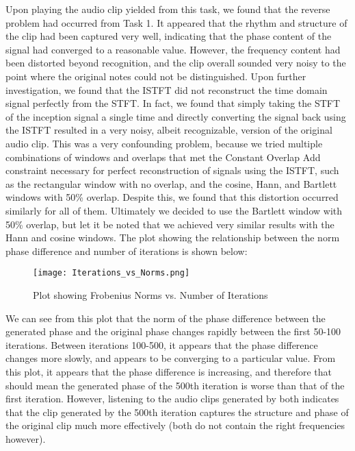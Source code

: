 \documentclass[letterpaper,twocolumn,10pt]{article}
\begin{document}
Upon playing the audio clip yielded from this task, we found that the reverse problem had occurred from Task 1. It appeared that the rhythm and structure of the clip had been captured very well, indicating that the phase content of the signal had converged to a reasonable value. However, the frequency content had been distorted beyond recognition, and the clip overall sounded very noisy to the point where the original notes could not be distinguished. \hspace*{\fill}
\vspace{3mm}
\linebreak
Upon further investigation, we found that the ISTFT did not reconstruct the time domain signal perfectly from the STFT. In fact, we found that simply taking the STFT of the inception signal a single time and directly converting the signal back using the ISTFT resulted in a very noisy, albeit recognizable, version of the original audio clip. This was a very confounding problem, because we tried multiple combinations of windows and overlaps that met the Constant Overlap Add constraint necessary for perfect reconstruction of signals using the ISTFT, such as the rectangular window with no overlap, and the cosine, Hann, and Bartlett windows with 50\% overlap. Despite this, we found that this distortion occurred similarly for all of them. Ultimately we decided to use the Bartlett window with 50\% overlap, but let it be noted that we achieved very similar results with the Hann and cosine windows.
\hspace*{\fill}
\vspace{3mm}
\linebreak
The plot showing the relationship between the norm phase difference and number of iterations is shown below: \hspace*{\fill}
\begin{figure}[!htb]
\centering
\texttt{[image: Iterations\_vs\_Norms.png]}
\caption{Plot showing Frobenius Norms vs. Number of Iterations \label{fig:Iterations_vs_Norms}}
\end{figure}
\vspace{13mm}
\linebreak
We can see from this plot that the norm of the phase difference between the generated phase and the original phase changes rapidly between the first 50-100 iterations. Between iterations 100-500, it appears that the phase difference changes more slowly, and appears to be converging to a particular value. From this plot, it appears that the phase difference is increasing, and therefore that should mean the generated phase of the 500th iteration is worse than that of the first iteration. However, listening to the audio clips generated by both indicates that the clip generated by the 500th iteration captures the structure and phase of the original clip much more effectively (both do not contain the right frequencies however). \hspace*{\fill}
\end{document}
